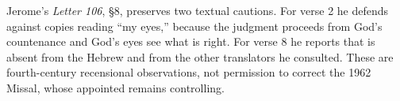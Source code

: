 Jerome's \emph{Letter 106}, §8, preserves two textual cautions. For verse 2 he
defends  against copies reading ``my eyes,'' because the
judgment proceeds from God's countenance and God's eyes see what is right. For
verse 8 he reports that  is absent from the Hebrew and from the
other translators he consulted. These are fourth-century recensional
observations, not permission to correct the 1962 Missal, whose appointed
 remains controlling.
